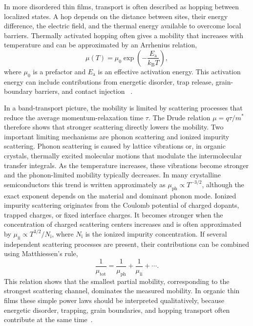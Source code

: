 In more disordered thin films, transport is often described as hopping between
localized states. A hop depends on the distance between sites, their energy
difference, the electric field, and the thermal energy available to overcome
local barriers. Thermally activated hopping often gives a mobility that increases
with temperature and can be approximated by an Arrhenius relation,
\begin{equation}
    \mu(T) = \mu_0
    \exp\left(-\frac{E_\mathrm{a}}{k_\mathrm{B}T}\right),
    \label{eq:arrhenius_mobility}
\end{equation}
where $\mu_0$ is a prefactor and $E_\mathrm{a}$ is an effective activation
energy. This activation energy can include contributions from energetic disorder,
trap release, grain-boundary barriers, and contact injection
~\cite{Bassler1993ChargeTransport,Bruetting2005}.

In a band-transport picture, the mobility is limited by scattering processes that
reduce the average momentum-relaxation time $\tau$. The Drude relation
$\mu=q\tau/m^*$ therefore shows that stronger scattering directly lowers the
mobility. Two important limiting mechanisms are phonon scattering and ionized
impurity scattering. Phonon scattering is caused by lattice vibrations or, in
organic crystals, thermally excited molecular motions that modulate the
intermolecular transfer integrals. As the temperature increases, these vibrations
become stronger and the phonon-limited mobility typically decreases. In many
crystalline semiconductors this trend is written approximately as
$\mu_\mathrm{ph}\propto T^{-3/2}$, although the exact exponent depends on the
material and dominant phonon mode. Ionized impurity scattering originates from
the Coulomb potential of charged dopants, trapped charges, or fixed interface
charges. It becomes stronger when the concentration of charged scattering centers
increases and is often approximated by
$\mu_\mathrm{ii}\propto T^{3/2}/N_\mathrm{i}$, where $N_\mathrm{i}$ is the
ionized impurity concentration. If several independent scattering processes are
present, their contributions can be combined using Matthiessen's rule,
\begin{equation}
    \frac{1}{\mu_\mathrm{tot}} = \frac{1}{\mu_\mathrm{ph}}
    + \frac{1}{\mu_\mathrm{ii}} + \cdots .
\end{equation}
This relation shows that the smallest partial mobility, corresponding to the
strongest scattering channel, dominates the measured mobility. In organic thin
films these simple power laws should be interpreted qualitatively, because
energetic disorder, trapping, grain boundaries, and hopping transport often
contribute at the same time~\cite{Neamen,Bruetting2005,Coropceanu2007ChargeTransport}.

